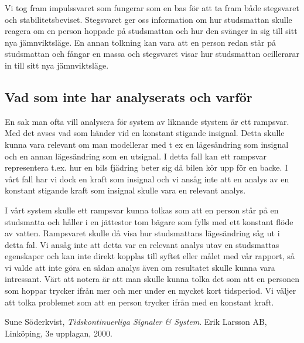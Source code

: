 \documentclass[10pt,a4paper]{article}
\begin{document}
Vi tog fram impulssvaret som fungerar som en bas för att ta fram både stegsvaret och stabilitetsbeviset. Stegsvaret ger oss information om hur studsmattan skulle reagera om en person hoppade på studsmattan och hur den svänger in sig till sitt nya jämnviktsläge. En annan tolkning kan vara att en person redan står på studsmattan och fångar en massa och stegsvaret visar hur studsmattan ocillerarar in till sitt nya jämnviktsläge.

\subsection{Vad som inte har analyserats och varför}

En sak man ofta vill analysera för system av liknande stystem är ett rampsvar. Med det avses vad som händer vid en konstant stigande insignal. Detta skulle kunna vara relevant om man modellerar med t ex en lägesändring som insignal och en annan lägesändring som en utsignal. I detta fall kan ett rampsvar representera t.ex. hur en bils fjädring beter sig då bilen kör upp för en backe. I vårt fall har vi dock en kraft som insignal och vi ansåg inte att en analys av en konstant stigande kraft som insignal skulle vara en relevant analys.

I vårt system skulle ett rampsvar kunna tolkas som att en person står på en studsmatta och håller i en jättestor tom bägare som fylls med ett konstant flöde av vatten. Rampsvaret skulle då visa hur studsmattans lägesändring såg ut i detta fal. Vi ansåg inte att detta var en relevant analys utav en studsmattas egenskaper och kan inte direkt kopplas till syftet eller målet med vår rapport, så vi valde att inte göra en sådan analys även om resultatet skulle kunna vara intressant. Värt att notera är att man skulle kunna tolka det som att en personen som hoppar trycker ifrån mer och mer under en mycket kort tidsperiod. Vi väljer att tolka problemet som att en person trycker ifrån med en konstant kraft.




\newpage

\begin{thebibliography}{9}

  Sune Söderkvist,
  \emph{Tidskontinuerliga Signaler \& System}.
  \linebreak
  Erik Larsson AB, Linköping,
  3e upplagan,
  2000.

\end{thebibliography}
\end{document}
